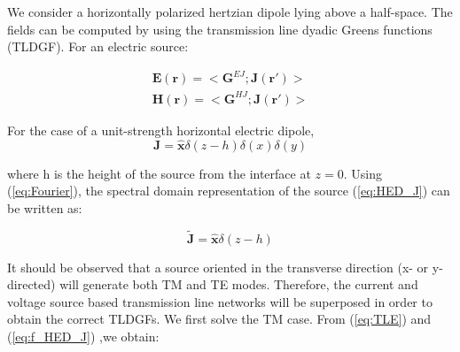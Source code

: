 \documentclass[11pt]{article}
\renewcommand{\v}[1]{\mathbf{#1}} %
\newcommand{\ti}[1]{\tilde{#1}} %
\renewcommand{\^}{\hat}  %
\begin{document}
We consider a horizontally polarized hertzian dipole lying above a half-space. The fields can be computed by using the transmission line dyadic Greens functions (TLDGF). For an electric source:

\begin{subequations}
  \begin{align}
    \v{E}(\v{r}) = <\v{G}^{EJ} ; \v{J}(\v{r'})>
    \label{eq:E_GJ}\\
    \v{H}(\v{r}) = <\v{G}^{HJ} ; \v{J}(\v{r'})>
  \end{align}
  \label{eq:EH_GJ}
\end{subequations}

For the case of a unit-strength horizontal electric dipole,
\begin{equation}
  \v{J} = \^{\v{x}} \delta(z -h) \delta(x) \delta(y)
  \label{eq:HED_J}
\end{equation}

where h is the height of the source from the interface at $z=0$. Using (\ref{eq:Fourier}), the spectral domain representation of the source (\ref{eq:HED_J}) can be written as:

\begin{equation}
  \ti{\v{J}} = \^{\v{x}} \delta(z -h)
  \label{eq:f_HED_J}
\end{equation}

It should be observed that a source oriented in the transverse direction (x- or y- directed) will generate both TM and TE modes. Therefore, the current and voltage source based transmission line networks will be superposed in order to obtain the correct TLDGFs. We first solve the TM case. From (\ref{eq:TLE}) and (\ref{eq:f_HED_J}) ,we obtain:




  \clearpage %
  
  
\end{document}
